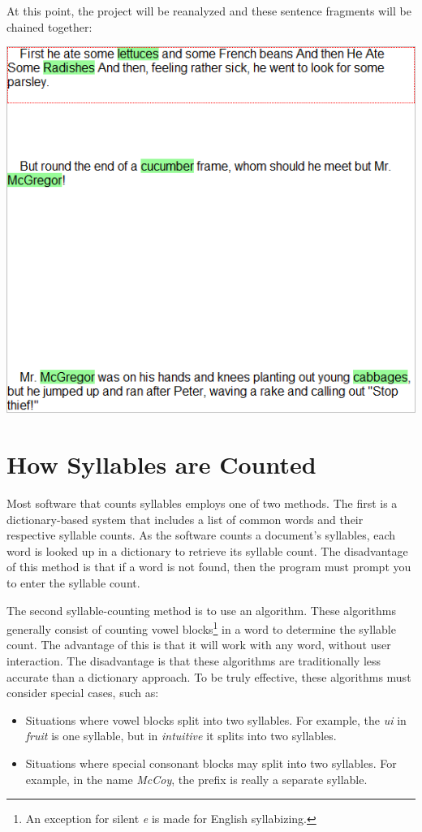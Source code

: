 \documentclass[
]{book}
\providecommand{\tightlist}{%
  \setlength{\itemsep}{0pt}\setlength{\parskip}{0pt}}
\theoremstyle{definition}
\theoremstyle{definition}
\theoremstyle{definition}
\theoremstyle{definition}
\theoremstyle{remark}
\begin{document}
At this point, the project will be reanalyzed and these sentence fragments will be chained together:

\begin{center}\includegraphics[width=0.75\linewidth,]{Images/PeterRabbitChainedSentences} \end{center}

\hypertarget{how-syllables-are-counted}{%
\section{How Syllables are Counted}\label{how-syllables-are-counted}}

Most software that counts syllables employs one of two methods. The first is a dictionary-based system that includes a list of common words and their respective syllable counts. As the software counts a document's syllables, each word is looked up in a dictionary to retrieve its syllable count. The disadvantage of this method is that if a word is not found, then the program must prompt you to enter the syllable count.

The second syllable-counting method is to use an algorithm. These algorithms generally consist of counting vowel blocks\footnote{An exception for silent \emph{e} is made for English syllabizing.} in a word to determine the syllable count. The advantage of this is that it will work with any word, without user interaction. The disadvantage is that these algorithms are traditionally less accurate than a dictionary approach. To be truly effective, these algorithms must consider special cases, such as:

\begin{itemize}
\tightlist
\item
  Situations where vowel blocks split into two syllables. For example, the \emph{ui} in \emph{fruit} is one syllable, but in \emph{intuitive} it splits into two syllables.
\item
  Situations where special consonant blocks may split into two syllables. For example, in the name \emph{McCoy}, the prefix is really a separate syllable.
\end{itemize}
\end{document}
